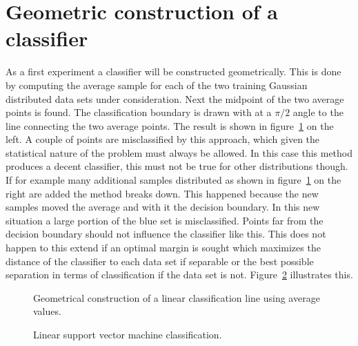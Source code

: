 \section{Geometric construction of a classifier}
As a first experiment a classifier will be constructed geometrically. This is done by computing the average sample for each of the two training Gaussian distributed data sets under consideration. Next the midpoint of the two average points is found. The classification boundary is drawn with at a $\pi/2$ angle to the line connecting the two average points. The result is shown in figure~\ref{fig:initGauss} on the left. A couple of points are misclassified by this approach, which given the statistical nature of the problem must always be allowed. In this case this method produces a decent classifier, this must not be true for other distributions though. If for example many additional samples distributed as shown in figure~\ref{fig:initGauss} on the right are added the method breaks down. This happened because the new samples moved the average and with it the decision boundary. In this new situation a large portion of the blue set is misclassified. 
Points far from the decision boundary should not influence the classifier like this. This does not happen to this extend if an optimal margin is sought which maximizes the distance of the classifier to each data set if separable or the best possible separation in terms of classification if the data set is not. Figure~\ref{fig:initGaussSvm} illustrates this.
\begin{figure}


\caption{Geometrical construction of a linear classification line using average values.}
\label{fig:initGauss}
\end{figure}
\begin{figure}


\caption{Linear support vector machine classification.}
\label{fig:initGaussSvm}
\end{figure}

